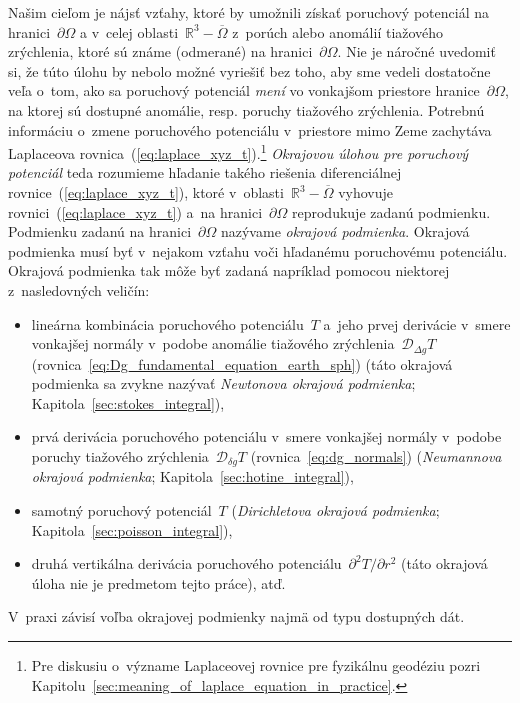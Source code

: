 \documentclass[a4paper, 12pt]{book}
\newcommand{\DIFF}{\mathcal D}
\begin{document}
Našim cieľom je nájsť vzťahy, ktoré by umožnili získať poruchový potenciál na 
hranici~$\partial \Omega$ a v~celej oblasti~$\mathbb{R}^3 - \overline{\Omega}$ 
z~porúch alebo anomálií tiažového zrýchlenia, ktoré sú známe (odmerané) na 
hranici~$\partial \Omega$.  Nie je náročné uvedomiť si, že túto úlohu by nebolo 
možné vyriešiť bez toho, aby sme vedeli dostatočne veľa o~tom, ako sa poruchový 
potenciál \emph{mení} vo vonkajšom priestore hranice~$\partial\Omega$, na 
ktorej sú dostupné anomálie, resp. poruchy tiažového zrýchlenia.  Potrebnú 
informáciu o~zmene poruchového potenciálu v~priestore mimo Zeme zachytáva 
Laplaceova rovnica~(\ref{eq:laplace_xyz_t}).\footnote{Pre diskusiu o~význame 
Laplaceovej rovnice pre fyzikálnu geodéziu pozri 
Kapitolu~\ref{sec:meaning_of_laplace_equation_in_practice}.}  \emph{Okrajovou 
úlohou pre poruchový potenciál} teda rozumieme hľadanie takého riešenia 
diferenciálnej rovnice~(\ref{eq:laplace_xyz_t}), ktoré v~oblasti~$\mathbb{R}^3 
- \overline\Omega$ vyhovuje rovnici~(\ref{eq:laplace_xyz_t}) a~na 
hranici~$\partial \Omega$ reprodukuje zadanú podmienku.  Podmienku zadanú na 
hranici~$\partial \Omega$ nazývame \emph{okrajová podmienka}.  Okrajová 
podmienka musí byť v~nejakom vzťahu voči hľadanému poruchovému potenciálu.  
Okrajová podmienka tak môže byť zadaná napríklad pomocou niektorej 
z~nasledovných veličín:
%
\begin{itemize}
\item lineárna kombinácia poruchového potenciálu~$T$ a~jeho prvej derivácie 
v~smere vonkajšej normály v~podobe anomálie tiažového zrýchlenia~$\DIFF_{\Delta 
g}T$ (rovnica~\ref{eq:Dg_fundamental_equation_earth_sph}) (táto okrajová 
podmienka sa zvykne nazývať \emph{Newtonova okrajová podmienka}; 
Kapitola~\ref{sec:stokes_integral}),
%
\item prvá derivácia poruchového potenciálu v~smere vonkajšej normály v~podobe 
poruchy tiažového zrýchlenia~$\DIFF_{\delta g} T$ (rovnica~\ref{eq:dg_normals}) 
(\emph{Neumannova okrajová podmienka}; Kapitola~\ref{sec:hotine_integral}),
%
\item samotný poruchový potenciál~$T$ (\emph{Dirichletova okrajová podmienka}; 
Kapitola~\ref{sec:poisson_integral}),
%
\item druhá vertikálna derivácia poruchového potenciálu~$\partial^2 
T / \partial r^2$ (táto okrajová úloha nie je predmetom tejto práce), atď.
\end{itemize}
%
V~praxi závisí voľba okrajovej podmienky najmä od typu dostupných dát.
\end{document}
